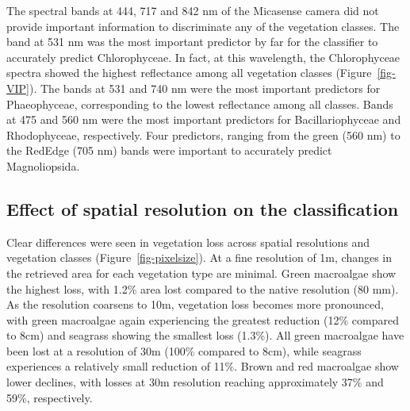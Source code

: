\documentclass[
  letterpaper,
  11pt,
  english,
  singlespacing,
  headsepline]{MastersDoctoralThesis}
\begin{document}
\begin{spacing}{1.5}
\begin{figure}
\end{figure}%

The spectral bands at 444, 717 and 842 nm of the Micasense camera did
not provide important information to discriminate any of the vegetation
classes. The band at 531 nm was the most important predictor by far for
the classifier to accurately predict Chlorophyceae. In fact, at this
wavelength, the Chlorophyceae spectra showed the highest reflectance
among all vegetation classes (Figure~\ref{fig-VIP}). The bands at 531
and 740 nm were the most important predictors for Phaeophyceae,
corresponding to the lowest reflectance among all classes. Bands at 475
and 560 nm were the most important predictors for Bacillariophyceae and
Rhodophyceae, respectively. Four predictors, ranging from the green (560
nm) to the RedEdge (705 nm) bands were important to accurately predict
Magnoliopsida.

\subsection{Effect of spatial resolution on the
classification}\label{effect-of-spatial-resolution-on-the-classification}

Clear differences were seen in vegetation loss across spatial
resolutions and vegetation classes (Figure~\ref{fig-pixelsize}). At a
fine resolution of 1m, changes in the retrieved area for each vegetation
type are minimal. Green macroalgae show the highest loss, with 1.2\%
area lost compared to the native resolution (80 mm). As the resolution
coarsens to 10m, vegetation loss becomes more pronounced, with green
macroalgae again experiencing the greatest reduction (12\% compared to
8cm) and seagrass showing the smallest loss (1.3\%). All green
macroalgae have been lost at a resolution of 30m (100\% compared to
8cm), while seagrass experiences a relatively small reduction of 11\%.
Brown and red macroalgae show lower declines, with losses at 30m
resolution reaching approximately 37\% and 59\%, respectively.

\begin{figure}

\end{figure}
\end{spacing}
\end{document}
